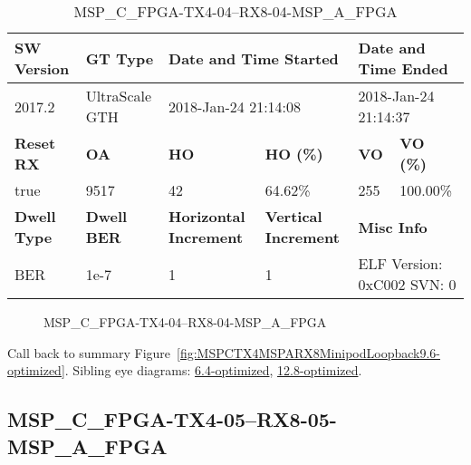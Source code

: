 \begin{table}[h]
\centering
\caption{MSP\_C\_FPGA-TX4-04--RX8-04-MSP\_A\_FPGA}
\label{tab:MSPCFPGATX404RX804MSPAFPGA9.6-optimized}
\begin{tabular}{@{}|l|l|l|l|l|l|@{}}
\toprule
\textbf{SW Version}                & \textbf{GT Type}   & \multicolumn{2}{l|}{\textbf{Date and Time Started}}            & \multicolumn{2}{l|}{\textbf{Date and Time Ended}}        \\ \midrule
2017.2                       & UltraScale GTH          & \multicolumn{2}{l|}{2018-Jan-24 21:14:08}                   & \multicolumn{2}{l|}{2018-Jan-24 21:14:37}               \\ \midrule
\textbf{Reset RX}                  & \textbf{OA} & \textbf{HO}   & \textbf{HO (\%)} & \textbf{VO} & \textbf{VO (\%)} \\ \midrule
true & 9517        & 42          & 64.62\%        & 255        & 100.00\%       \\ \midrule
\textbf{Dwell Type}                & \textbf{Dwell BER} & \textbf{Horizontal Increment} & \textbf{Vertical Increment}    & \multicolumn{2}{l|}{\textbf{Misc Info}}                  \\ \midrule
BER                            & 1e-7        & 1        & 1           & \multicolumn{2}{l|}{ELF Version: 0xC002 SVN: 0}                         \\ \bottomrule
\end{tabular}
\end{table}

\begin{figure}[h]
\caption{MSP\_C\_FPGA-TX4-04--RX8-04-MSP\_A\_FPGA} \label{fig:MSPCFPGATX404RX804MSPAFPGA9.6-optimized}
\end{figure}

Call back to summary Figure~\ref{fig:MSPCTX4MSPARX8MinipodLoopback9.6-optimized}.
Sibling eye diagrams: \hyperref[sec:MSPCFPGATX404RX804MSPAFPGA6.4-optimized]{6.4-optimized}, \hyperref[sec:MSPCFPGATX404RX804MSPAFPGA12.8-optimized]{12.8-optimized}.

\clearpage
\newpage


\subsection{MSP\_C\_FPGA-TX4-05--RX8-05-MSP\_A\_FPGA}\label{sec:MSPCFPGATX405RX805MSPAFPGA9.6-optimized}

